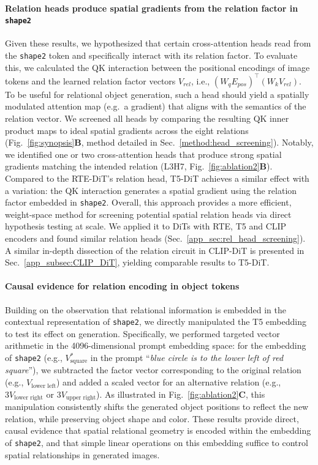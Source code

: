 \paragraph{Relation heads produce spatial gradients from the relation factor in \texttt{shape2}}
Given these results, we hypothesized that certain cross-attention heads read from the \texttt{shape2} token and specifically interact with its relation factor. To evaluate this, we calculated the QK interaction between the positional encodings of image tokens and the learned relation factor vectors $V_{rel}$, i.e., $(W_q E_{pos})^\top(W_k V_{rel})$. To be useful for relational object generation, such a head should yield a spatially modulated attention map (e.g.\ a gradient) that aligns with the semantics of the relation vector. We screened all heads by comparing the resulting QK inner product maps to ideal spatial gradients across the eight relations (Fig.~\ref{fig:synopsis}\textbf{B}, method detailed in Sec.~\ref{method:head_screening}). Notably, we identified one or two cross-attention heads that produce strong spatial gradients matching the intended relation (L3H7, Fig.~\ref{fig:ablation2}\textbf{B}).
Compared to the RTE-DiT's relation head, T5-DiT achieves a similar effect with a variation: the QK interaction generates a spatial gradient using the relation factor embedded in \texttt{shape2}.
Overall, this approach provides a more efficient, weight-space method for screening potential spatial relation heads via direct hypothesis testing at scale. We applied it to DiTs with RTE, T5 and CLIP encoders and found similar relation heads (Sec.~\ref{app_sec:rel_head_screening}).
A similar in-depth dissection of the relation circuit in CLIP-DiT is presented in Sec.~\ref{app_subsec:CLIP_DiT}, yielding comparable results to T5-DiT.

\paragraph{Causal evidence for relation encoding in object tokens}
Building on the observation that relational information is embedded in the contextual representation of \texttt{shape2}, we directly manipulated the T5 embedding to test its effect on generation. Specifically, we performed targeted vector arithmetic in the 4096-dimensional prompt embedding space: for the embedding of \texttt{shape2} (e.g., $V^*_{\text{square}}$ in the prompt ``\textit{blue circle is to the lower left of red square}''), we subtracted the factor vector corresponding to the original relation (e.g., $V_{\text{lower left}}$) and added a scaled vector for an alternative relation (e.g., $3V_{\text{lower right}}$ or $3V_{\text{upper right}}$). As illustrated in Fig.~\ref{fig:ablation2}\textbf{C}, this manipulation consistently shifts the generated object positions to reflect the new relation, while preserving object shape and color. These results provide direct, causal evidence that spatial relational geometry is encoded within the embedding of \texttt{shape2}, and that simple linear operations on this embedding suffice to control spatial relationships in generated images.

